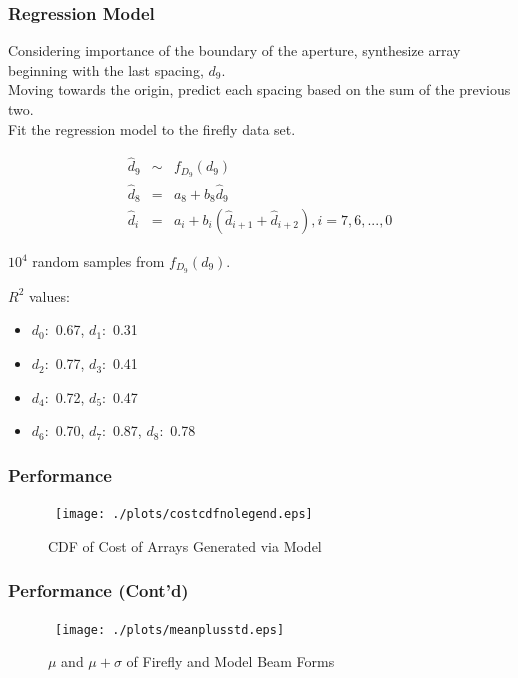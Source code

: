 \documentclass[...]{beamer}
\begin{document}
\begin{frame}
  \frametitle{Regression Model}

  Considering importance of the boundary of the aperture, synthesize array beginning with the last spacing, $d_9$.\\
  \vspace{3mm}
  Moving towards the origin, predict each spacing based on the sum of the previous two.\\
  \vspace{3mm}
  Fit the regression model to the firefly data set.
  
  \begin{eqnarray*}
    \hat{d}_9 &\sim& f_{D_9}(d_9)\\
    \hat{d}_8 & = & a_8 + b_8\hat{d}_9\\
    \hat{d}_i & = & a_i + b_i\left(\hat{d}_{i+1}+\hat{d}_{i+2}\right), i=7,6,...,0
  \end{eqnarray*}

  $10^4$ random samples from $f_{D_9}(d_9)$.

  $R^2$ values:
  \begin{itemize}
    \item $d_0:$ 0.67, $d_1:$ 0.31
    \item $d_2:$ 0.77, $d_3:$ 0.41
    \item $d_4:$ 0.72, $d_5:$ 0.47
    \item $d_6:$ 0.70, $d_7:$ 0.87, $d_8:$ 0.78
  \end{itemize}

\end{frame}

\begin{frame}
  \frametitle{Performance}

  \begin{figure}[H] 
    \centerline{\hbox{ \hspace{0.0in}
        \texttt{[image: ./plots/costcdfnolegend.eps]}
      }
    }
    \caption {CDF of Cost of Arrays Generated via Model}\label{fig:costcdf}
  \end{figure}

\end{frame}

\begin{frame}
  \frametitle{Performance (Cont'd)}

  \begin{figure}[H] 
    \centerline{\hbox{ \hspace{0.0in}
        \texttt{[image: ./plots/meanplusstd.eps]}
      }
    }
    \caption {$\mu$ and $\mu + \sigma$ of Firefly and Model Beam Forms}\label{fig:meanplusstd}
  \end{figure}

\end{frame}
\end{document}
